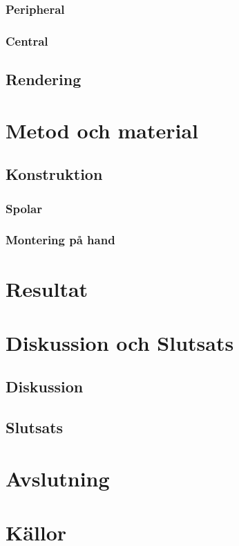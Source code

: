 \documentclass[a4paper]{article}
\begin{document}
\begin{sloppypar}
    \subsubsection{Peripheral}
    \subsubsection{Central}

    \subsection{Rendering}

    \section{Metod och material}
    \subsection{Konstruktion}
    \subsubsection{Spolar}
    \subsubsection{Montering på hand} %


    \section{Resultat}
    \section{Diskussion och Slutsats}
    \subsection{Diskussion}

    \subsection{Slutsats}

    \section{Avslutning}




    \section{Källor}


\end{sloppypar}
\end{document}
